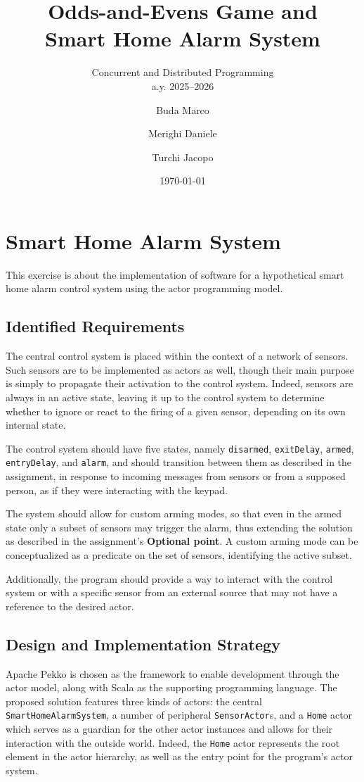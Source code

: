 \documentclass{scrartcl}
\title{\LARGE
  Odds-and-Evens Game and \\ Smart Home Alarm System
}
\subtitle{Concurrent and Distributed Programming\\a.y. 2025--2026}
\author{
    Buda Marco \and Merighi Daniele \and Turchi Jacopo
}
\date{\today}
\begin{document}
\maketitle

\section{Smart Home Alarm System}

This exercise is about the implementation of software for a hypothetical smart home alarm control system using the actor programming model.

\subsection{Identified Requirements}

The central control system is placed within the context of a network of sensors. Such sensors are to be implemented as actors as well, though their main purpose is simply to propagate their activation to the control system. Indeed, sensors are always in an active state, leaving it up to the control system to determine whether to ignore or react to the firing of a given sensor, depending on its own internal state.

The control system should have five states, namely \texttt{disarmed}, \texttt{exitDelay}, \texttt{armed}, \texttt{entryDelay}, and \texttt{alarm}, and should transition between them as described in the assignment, in response to incoming messages from sensors or from a supposed person, as if they were interacting with the keypad.

The system should allow for custom arming modes, so that even in the armed state only a subset of sensors may trigger the alarm, thus extending the solution as described in the assignment's \textbf{Optional point}. A custom arming mode can be conceptualized as a predicate on the set of sensors, identifying the active subset.

Additionally, the program should provide a way to interact with the control system or with a specific sensor from an external source that may not have a reference to the desired actor.

\subsection{Design and Implementation Strategy}

Apache Pekko is chosen as the framework to enable development through the actor model, along with Scala as the supporting programming language. The proposed solution features three kinds of actors: the central \texttt{SmartHomeAlarmSystem}, a number of peripheral \texttt{SensorActor}s, and a \texttt{Home} actor which serves as a guardian for the other actor instances and allows for their interaction with the outside world. Indeed, the \texttt{Home} actor represents the root element in the actor hierarchy, as well as the entry point for the program's actor system.
\end{document}
